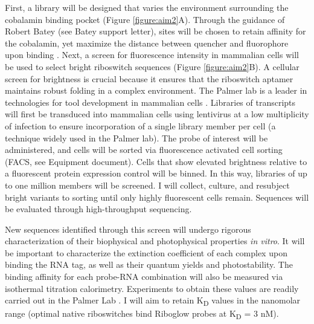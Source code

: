First, a library will be designed that varies the environment surrounding the cobalamin binding pocket (Figure \ref{figure:aim2}A). Through the guidance of Robert Batey (see Batey support letter), sites will be chosen to retain affinity for the cobalamin, yet maximize the distance between quencher and fluorophore upon binding \cite{JohnsonJrB12cofactorsdirectly2012}.
Next, a screen for fluorescence intensity in mammalian cells will be used to select bright riboswitch sequences (Figure \ref{figure:aim2}B).
A cellular screen for brightness is crucial because it ensures that the riboswitch aptamer maintains robust folding in a complex environment.
The Palmer lab is a leader in technologies for tool development in mammalian cells \cite{FiedlerDropletMicrofluidicFlow2017,DeanHighSpeedMultiparameterPhotophysical2015}. Libraries of transcripts will first be transduced into mammalian cells using lentivirus at a low multiplicity of infection to ensure incorporation of a single library member per cell (a technique widely used in the Palmer lab).
The probe of interest will be administered, and cells will be sorted via fluorescence activated cell sorting (FACS, see Equipment document).
Cells that show elevated brightness relative to a fluorescent protein expression control will be binned.
In this way, libraries of up to one million members will be screened.
I will collect, culture, and resubject bright variants to sorting until only highly fluorescent cells remain. Sequences will be evaluated through high-throughput sequencing.

New sequences identified through this screen will undergo rigorous characterization of their biophysical and photophysical properties \textit{in vitro}. It will be important to characterize the extinction coefficient of each complex upon binding the RNA tag, as well as their quantum yields and photostability. The binding affinity for each probe-RNA combination will also be measured via isothermal titration calorimetry. Experiments to obtain these values are readily carried out in the Palmer Lab  \cite{ParkQuantitativeMeasurementCa22014,Braselmannmulticolorriboswitchbasedplatform2018}.
I will aim to retain K\textsubscript{D} values in the nanomolar range (optimal native riboswitches bind Riboglow probes at K\textsubscript{D} = 3 nM). 


